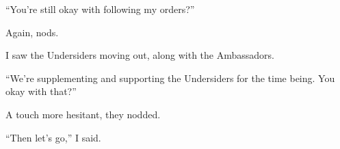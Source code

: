 ``You're still okay with following my orders?''



Again, nods.



I saw the Undersiders moving out, along with the Ambassadors.



``We're supplementing and supporting the Undersiders for the time being.  You okay with that?''



A touch more hesitant, they nodded.



``Then let's go,'' I said.





